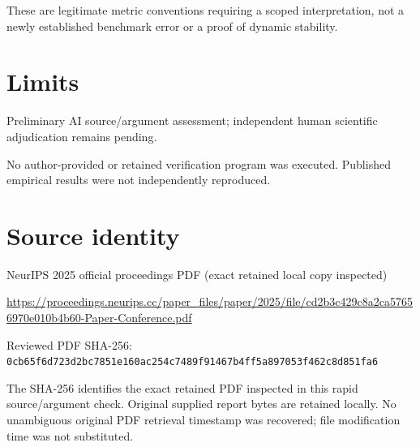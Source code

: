 \documentclass[11pt]{article}
\begin{document}
These are legitimate metric conventions requiring a scoped interpretation, not a newly established benchmark error or a proof of dynamic stability.

\section*{Limits}

Preliminary AI source/argument assessment; independent human scientific adjudication remains pending.\par

No author-provided or retained verification program was executed. Published empirical results were not independently reproduced.\par

\section*{Source identity}

NeurIPS 2025 official proceedings PDF (exact retained local copy inspected)

\url{https://proceedings.neurips.cc/paper_files/paper/2025/file/cd2b3c429c8a2ca57656970e010b4b60-Paper-Conference.pdf}

Reviewed PDF SHA-256: \nolinkurl{0cb65f6d723d2bc7851e160ac254c7489f91467b4ff5a897053f462c8d851fa6}

The SHA-256 identifies the exact retained PDF inspected in this rapid source/argument check. Original supplied report bytes are retained locally. No unambiguous original PDF retrieval timestamp was recovered; file modification time was not substituted.
\end{document}
